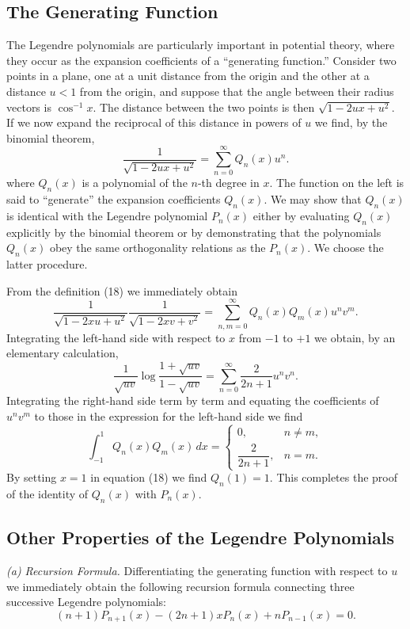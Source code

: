 \subsection{The Generating Function}
The Legendre polynomials are particularly important in potential theory, where they occur as the expansion coefficients of a ``generating function.'' Consider two points in a plane, one at a unit distance from the origin and the other at a distance $u<1$ from the origin, and suppose that the angle between their radius vectors is $\cos^{-1}x$. The distance between the two points is then $\sqrt{1-2ux+u^2}$. If we now expand the reciprocal of this distance in powers of $u$ we find, by the binomial theorem,
\begin{equation}
\frac{1}{\sqrt{1-2ux+u^2}}=\sum_{n=0}^{\infty}Q_n(x)u^n.
\tag{18}
\end{equation}
where $Q_n(x)$ is a polynomial of the $n$-th degree in $x$. The function on the left is said to ``generate'' the expansion coefficients $Q_n(x)$. We may show that $Q_n(x)$ is identical with the Legendre polynomial $P_n(x)$ either by evaluating $Q_n(x)$ explicitly by the binomial theorem or by demonstrating that the polynomials $Q_n(x)$ obey the same orthogonality relations as the $P_n(x)$. We choose the latter procedure.

From the definition (18) we immediately obtain
\[
\frac{1}{\sqrt{1-2xu+u^2}}\frac{1}{\sqrt{1-2xv+v^2}}
=\sum_{n,m=0}^{\infty}Q_n(x)Q_m(x)u^nv^m.
\]
Integrating the left-hand side with respect to $x$ from $-1$ to $+1$ we obtain, by an elementary calculation,
\[
\frac{1}{\sqrt{uv}}\log\frac{1+\sqrt{uv}}{1-\sqrt{uv}}
=\sum_{n=0}^{\infty}\frac{2}{2n+1}u^nv^n.
\]
Integrating the right-hand side term by term and equating the coefficients of $u^nv^m$ to those in the expression for the left-hand side we find
\[
\int_{-1}^{1}Q_n(x)Q_m(x)\,dx=
\begin{cases}
0,& n\ne m,\\[2mm]
\dfrac{2}{2n+1},& n=m.
\end{cases}
\]
By setting $x=1$ in equation (18) we find $Q_n(1)=1$. This completes the proof of the identity of $Q_n(x)$ with $P_n(x)$.

\subsection{Other Properties of the Legendre Polynomials}
\textit{(a) Recursion Formula.} Differentiating the generating function with respect to $u$ we immediately obtain the following recursion formula connecting three successive Legendre polynomials:
\begin{equation}
(n+1)P_{n+1}(x)-(2n+1)xP_n(x)+nP_{n-1}(x)=0.
\tag{19}
\end{equation}

